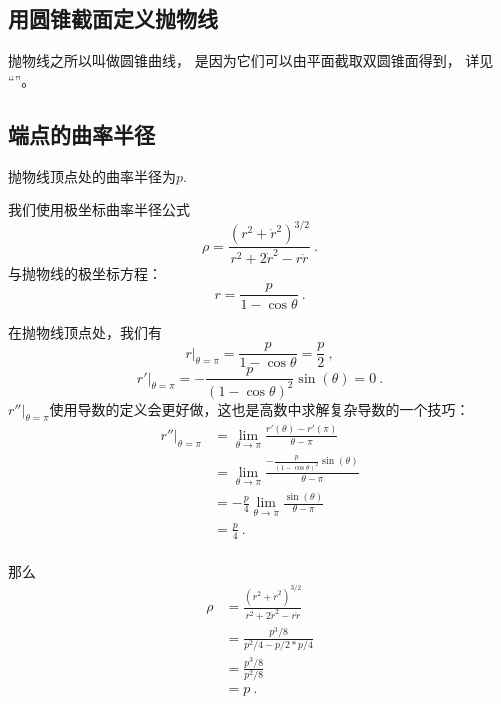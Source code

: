 \subsection{用圆锥截面定义抛物线}
抛物线之所以叫做圆锥曲线， 是因为它们可以由平面截取双圆锥面得到， 详见 “”。

\subsection{端点的曲率半径}
抛物线顶点处的曲率半径为$p$.

我们使用极坐标曲率半径公式
$$
\rho = \frac{(r^2 + \dot r^2)^{3/2}}{r^2 + 2\dot r^2 - r\ddot r}~.
$$
与抛物线的极坐标方程：
$$
r = \frac{p}{1 - \cos \theta }~.
$$

在抛物线顶点处，我们有
$$
r|_{\theta = \pi} = \frac{p}{1 - \cos \theta} = \frac{p}{2}~,
$$
$$
r' |_{\theta = \pi} = -\frac{p}{(1 - \cos \theta)^2} \sin(\theta) = 0~.
$$
$r'' |_{\theta = \pi}$使用导数的定义会更好做，这也是高数中求解复杂导数的一个技巧：
$$
\begin{aligned}
r''|_{\theta = \pi}  &= \lim_{\theta \to \pi} \frac{r'(\theta) - r'(\pi)}{\theta - \pi}\\
&=\lim_{\theta \to \pi} \frac{-\frac{p}{(1 - \cos \theta)^2} \sin(\theta)}{\theta - \pi}\\
&=-\frac{p}{4} \lim_{\theta \to \pi} \frac{\sin(\theta)}{\theta - \pi}\\
&=\frac{p}{4}~.\\
\end{aligned}
$$

那么
$$
\begin{aligned}
\rho &= \frac{(r^2 + \dot r^2)^{3/2}}{r^2 + 2\dot r^2 - r\ddot r}\\
&=\frac{p^3/8}{p^2/4 - p/2*p/4}\\
&=\frac{p^3/8}{p^2/8}\\
&=p~.\\
\end{aligned}
$$

